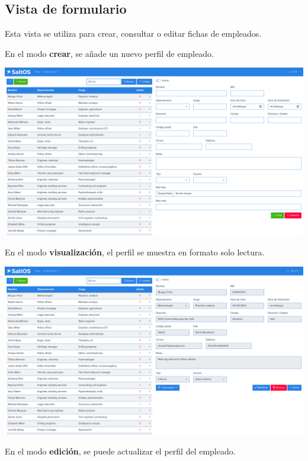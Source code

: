 \documentclass[a4paper]{article}
\begin{document}
\hypertarget{toc109}{}
\subsection{Vista de formulario}

Esta vista se utiliza para crear, consultar o editar fichas de empleados.

En el modo \textbf{crear}, se añade un nuevo perfil de empleado.

\begin{center}\includegraphics[width=1\textwidth]{../ujest/snaps/test-screenshots-js-screenshots-hr-employees-create-es-es-1-snap.png}\end{center}

En el modo \textbf{visualización}, el perfil se muestra en formato solo lectura.

\begin{center}\includegraphics[width=1\textwidth]{../ujest/snaps/test-screenshots-js-screenshots-hr-employees-view-100-es-es-1-snap.png}\end{center}

En el modo \textbf{edición}, se puede actualizar el perfil del empleado.
\end{document}
